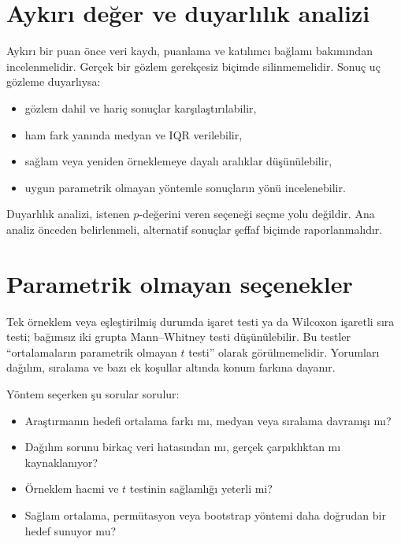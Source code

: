 \section{Aykırı değer ve duyarlılık analizi}

Aykırı bir puan önce veri kaydı, puanlama ve katılımcı bağlamı bakımından
incelenmelidir. Gerçek bir gözlem gerekçesiz biçimde silinmemelidir. Sonuç uç
gözleme duyarlıysa:

\begin{itemize}
  \item gözlem dahil ve hariç sonuçlar karşılaştırılabilir,
  \item ham fark yanında medyan ve IQR verilebilir,
  \item sağlam veya yeniden örneklemeye dayalı aralıklar düşünülebilir,
  \item uygun parametrik olmayan yöntemle sonuçların yönü incelenebilir.
\end{itemize}

Duyarlılık analizi, istenen $p$-değerini veren seçeneği seçme yolu değildir.
Ana analiz önceden belirlenmeli, alternatif sonuçlar şeffaf biçimde
raporlanmalıdır.

\section{Parametrik olmayan seçenekler}

Tek örneklem veya eşleştirilmiş durumda işaret testi ya da Wilcoxon işaretli
sıra testi; bağımsız iki grupta Mann--Whitney testi düşünülebilir. Bu testler
``ortalamaların parametrik olmayan $t$ testi'' olarak görülmemelidir.
Yorumları dağılım, sıralama ve bazı ek koşullar altında konum farkına dayanır.

Yöntem seçerken şu sorular sorulur:

\begin{itemize}
  \item Araştırmanın hedefi ortalama farkı mı, medyan veya sıralama davranışı mı?
  \item Dağılım sorunu birkaç veri hatasından mı, gerçek çarpıklıktan mı kaynaklanıyor?
  \item Örneklem hacmi ve $t$ testinin sağlamlığı yeterli mi?
  \item Sağlam ortalama, permütasyon veya bootstrap yöntemi daha doğrudan bir hedef sunuyor mu?
\end{itemize}

